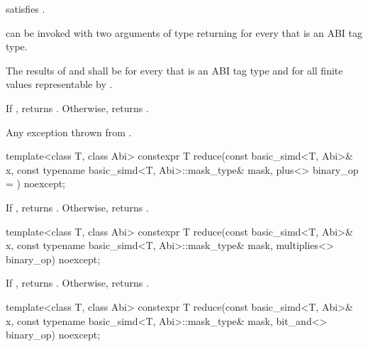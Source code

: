 \begin{itemdescr}
  \pnum\constraints
   satisfies .

  \pnum\mandates
   can be invoked with two arguments of type  returning  for every  that is an ABI tag type.

  \pnum\expects
  The results of  and  shall be  for every  that is an ABI tag type and for all finite values  representable by .

  \pnum\returns
  If , returns .
  Otherwise, returns  \forallmaskedi.

  \pnum\throws
  Any exception thrown from .
\end{itemdescr}

\begin{itemdecl}
template<class T, class Abi>
  constexpr T reduce(const basic_simd<T, Abi>& x, const typename basic_simd<T, Abi>::mask_type& mask,
                     plus<> binary_op = {}) noexcept;
\end{itemdecl}

\begin{itemdescr}
  \pnum\returns
  If , returns . Otherwise, returns  \forallmaskedi.
\end{itemdescr}

\begin{itemdecl}
template<class T, class Abi>
  constexpr T reduce(const basic_simd<T, Abi>& x, const typename basic_simd<T, Abi>::mask_type& mask,
                     multiplies<> binary_op) noexcept;
\end{itemdecl}

\begin{itemdescr}
  \pnum\returns
  If , returns . Otherwise, returns  \forallmaskedi.
\end{itemdescr}

\begin{itemdecl}
template<class T, class Abi>
  constexpr T reduce(const basic_simd<T, Abi>& x, const typename basic_simd<T, Abi>::mask_type& mask,
                     bit_and<> binary_op) noexcept;
\end{itemdecl}

